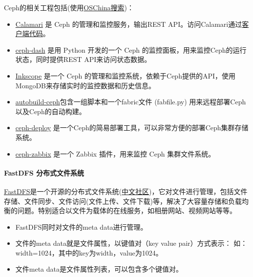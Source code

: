 \documentclass[letterpaper,10pt,english]{sphinxmanual}
\begin{document}
Ceph的相关工程包括(使用\href{http://www.oschina.net/search?scope=project\&q=ceph}{OSChina搜索})：
\begin{itemize}
\item {} 
\href{https://github.com/ceph/calamari}{Calamari} 是 Ceph
的管理和监控服务，输出REST
API。访问Calamari通过\href{https://github.com/ceph/calamari-clients}{客户端代码}。

\item {} 
\href{https://github.com/Crapworks/ceph-dash}{ceph-dash} 是用 Python
开发的一个 Ceph 的监控面板，用来监控Ceph的运行状态，同时提供REST
API来访问状态数据。

\item {} 
\href{https://github.com/inkscope/inkscope}{Inkscope} 是一个 Ceph
的管理和监控系统，依赖于Ceph提供的API，使用MongoDB来存储实时的监控数据和历史信息。

\item {} 
\href{https://github.com/ceph/autobuild-ceph}{autobuild-ceph}包含一组脚本和一个fabric文件
(fabfile.py) 用来远程部署Ceph以及Ceph的自动构建。

\item {} 
\href{https://github.com/ceph/ceph-deploy}{ceph-deploy}
是一个Ceph的简易部署工具，可以非常方便的部署Ceph集群存储系统。

\item {} 
\href{https://github.com/thelan/ceph-zabbix}{ceph-zabbix} 是一个 Zabbix
插件，用来监控 Ceph 集群文件系统。

\end{itemize}


\paragraph{FastDFS 分布式文件系统}
\label{gispark_cloud:FastDFS-_u5206_u5e03_u5f0f_u6587_u4ef6_u7cfb_u7edf}
\href{https://github.com/happyfish100/fastdfs}{FastDFS}是一个开源的分布式文件系统(\href{http://bbs.chinaunix.net/forum-240-1.html}{中文社区})，它对文件进行管理，包括文件存储、文件同步、文件访问(文件上传、文件下载)等，解决了大容量存储和负载均衡的问题。特别适合以文件为载体的在线服务，如相册网站、视频网站等等。
\begin{itemize}
\item {} 
FastDFS同时对文件的meta data进行管理。

\item {} 
文件的meta data就是文件属性，以键值对（key value pair）方式表示：
如：width=1024，其中的key为width，value为1024。

\item {} 
文件meta data是文件属性列表，可以包含多个键值对。

\end{itemize}
\end{document}
